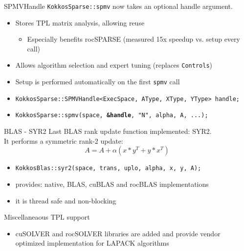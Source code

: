 \begin{frame}{SPMVHandle}
  \texttt{KokkosSparse::spmv} now takes an optional handle argument.
\begin{itemize}
  \item Stores TPL matrix analysis, allowing reuse
  \begin{itemize}
    \item Especially benefits rocSPARSE (measured 15x speedup vs. setup every call)
  \end{itemize}
  \item Allows algorithm selection and expert tuning (replaces \texttt{Controls})
  \item Setup is performed automatically on the first \texttt{spmv} call
  \item \texttt{KokkosSparse::SPMVHandle<ExecSpace, AType, XType, YType> handle;}
  \item \texttt{KokkosSparse::spmv(space, \textbf{\&handle}, "N", alpha, A, ...);}
\end{itemize}

\end{frame}


\begin{frame}{BLAS - SYR2}
Last BLAS rank update function implemented: SYR2.\\
It performs a symmetric rank-2 update:
\begin{equation*}A=A+\alpha (x*y^T+y*x^T)\end{equation*}
\begin{itemize}
\item {\tt KokkosBlas::syr2(space, trans, uplo, alpha, x, y, A);}
\item provides: native, BLAS, cuBLAS and rocBLAS implementations
\item it is thread safe and non-blocking
\end{itemize}
\end{frame}



\begin{frame}{Miscellaneaous}
TPL support
\begin{itemize}
\item cuSOLVER and rocSOLVER libraries are added and provide vendor optimized implementation for LAPACK algorithms
\end{itemize}
\end{frame}

